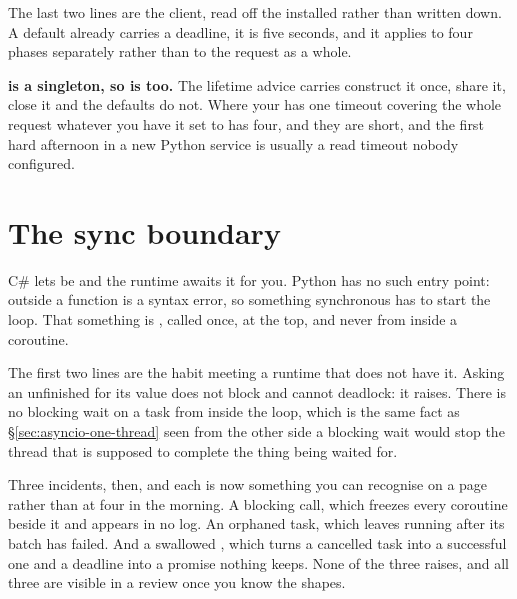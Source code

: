 The last two lines are the client, read off the installed 
rather than written down. A default  already
carries a deadline, it is five seconds, and it applies to four phases
separately rather than to the request as a whole.

\begin{trapbox}
\textbf{ is a singleton, so  is too.}
The lifetime advice carries \dash{} construct it once, share it, close it
\dash{} and the defaults do not. Where your  has one
timeout covering the whole request \dash{} whatever you have it set to
\dash{}  has four, and they are short, and the first hard
afternoon in a new Python service is usually a read timeout nobody
configured.
\end{trapbox}

\section{The sync boundary}
\label{sec:asyncio-boundary}

C\# lets  be  and the runtime awaits it for you.
Python has no such entry point:  outside a function is a
syntax error, so something synchronous has to start the loop. That
something is , called once, at the top, and never from
inside a coroutine.



\noindent
The first two lines are the  habit meeting a runtime that
does not have it. Asking an unfinished  for its value does not block
and cannot deadlock: it raises. There is no blocking wait on a task from
inside the loop, which is the same fact as \S\ref{sec:asyncio-one-thread}
seen from the other side \dash{} a blocking wait would stop the thread
that is supposed to complete the thing being waited for.

\medskip
\noindent
Three incidents, then, and each is now something you can recognise on a
page rather than at four in the morning. A blocking call, which freezes
every coroutine beside it and appears in no log. An orphaned task, which
 leaves running after its batch has failed. And a swallowed
, which turns a cancelled task into a successful one
and a deadline into a promise nothing keeps. None of the three raises, and
all three are visible in a review once you know the shapes.
